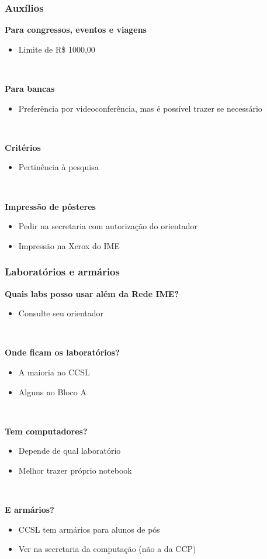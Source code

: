 \documentclass{beamer}
\begin{document}
\begin{frame}
  \frametitle{Auxílios}

  \textbf{Para congressos, eventos e viagens}
  \begin{itemize}
    \item Limite de R\$ 1000,00
  \end{itemize}~\\\pause

  \textbf{Para bancas}
  \begin{itemize}
    \item Preferência por videoconferência, mas é possível trazer se necessário
  \end{itemize}~\\\pause

  \textbf{Critérios}
  \begin{itemize}
    \item Pertinência à pesquisa
  \end{itemize}~\\\pause

  \textbf{Impressão de pôsteres}
  \begin{itemize}
    \item Pedir na secretaria com autorização do orientador
    \item Impressão na Xerox do IME
  \end{itemize}
\end{frame}

\begin{frame}
  \frametitle{Laboratórios e armários}

  \textbf{Quais labs posso usar além da Rede IME?}
  \begin{itemize}
    \item Consulte seu orientador
  \end{itemize}~\\\pause

  \textbf{Onde ficam os laboratórios?}
  \begin{itemize}
    \item A maioria no CCSL
    \item Alguns no Bloco A
  \end{itemize}~\\\pause

  \textbf{Tem computadores?}
  \begin{itemize}
    \item Depende de qual laboratório
    \item Melhor trazer próprio notebook
  \end{itemize}~\\\pause

  \textbf{E armários?}
  \begin{itemize}
    \item CCSL tem armários para alunos de pós
    \item Ver na secretaria da computação (não a da CCP)
  \end{itemize}
\end{frame}
\end{document}
